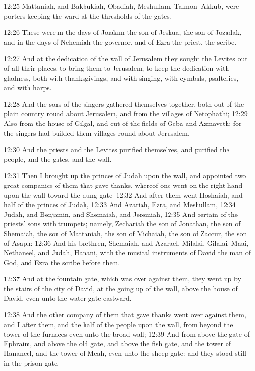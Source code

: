 12:25 Mattaniah, and Bakbukiah, Obadiah, Meshullam, Talmon, Akkub, were porters keeping the ward at the thresholds of the gates.

12:26 These were in the days of Joiakim the son of Jeshua, the son of Jozadak, and in the days of Nehemiah the governor, and of Ezra the priest, the scribe.

12:27 And at the dedication of the wall of Jerusalem they sought the Levites out of all their places, to bring them to Jerusalem, to keep the dedication with gladness, both with thanksgivings, and with singing, with cymbals, psalteries, and with harps.

12:28 And the sons of the singers gathered themselves together, both out of the plain country round about Jerusalem, and from the villages of Netophathi; 12:29 Also from the house of Gilgal, and out of the fields of Geba and Azmaveth: for the singers had builded them villages round about Jerusalem.

12:30 And the priests and the Levites purified themselves, and purified the people, and the gates, and the wall.

12:31 Then I brought up the princes of Judah upon the wall, and appointed two great companies of them that gave thanks, whereof one went on the right hand upon the wall toward the dung gate: 12:32 And after them went Hoshaiah, and half of the princes of Judah, 12:33 And Azariah, Ezra, and Meshullam, 12:34 Judah, and Benjamin, and Shemaiah, and Jeremiah, 12:35 And certain of the priests' sons with trumpets; namely, Zechariah the son of Jonathan, the son of Shemaiah, the son of Mattaniah, the son of Michaiah, the son of Zaccur, the son of Asaph: 12:36 And his brethren, Shemaiah, and Azarael, Milalai, Gilalai, Maai, Nethaneel, and Judah, Hanani, with the musical instruments of David the man of God, and Ezra the scribe before them.

12:37 And at the fountain gate, which was over against them, they went up by the stairs of the city of David, at the going up of the wall, above the house of David, even unto the water gate eastward.

12:38 And the other company of them that gave thanks went over against them, and I after them, and the half of the people upon the wall, from beyond the tower of the furnaces even unto the broad wall; 12:39 And from above the gate of Ephraim, and above the old gate, and above the fish gate, and the tower of Hananeel, and the tower of Meah, even unto the sheep gate: and they stood still in the prison gate.


